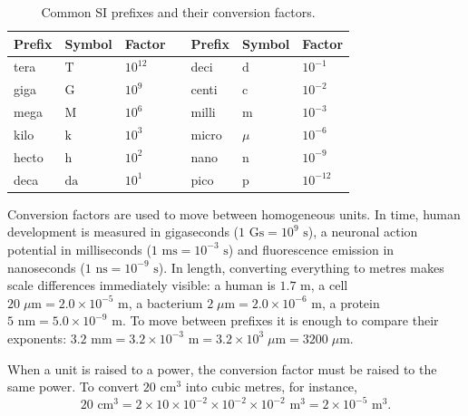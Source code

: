 \documentclass[letterpaper,11pt,leqno]{book}
\begin{document}
\begin{table}[!htbp]
\centering
\caption{Common SI prefixes and their conversion factors.}
\label{tab:si_prefixes}
\begin{tabular*}{\textwidth}{l@{\extracolsep\fill}llclll}
\toprule
Prefix & Symbol & Factor & \hspace{0.8cm} & Prefix & Symbol & Factor \\
\midrule
tera & $\text{T}$ & $10^{12}$ & & deci & $\text{d}$ & $10^{-1}$ \\
giga & $\text{G}$ & $10^9$ & & centi & $\text{c}$ & $10^{-2}$ \\
mega & $\text{M}$ & $10^6$ & & milli & $\text{m}$ & $10^{-3}$ \\
kilo & $\text{k}$ & $10^3$ & & micro & $\mu$ & $10^{-6}$ \\
hecto & $\text{h}$ & $10^2$ & & nano & $\text{n}$ & $10^{-9}$ \\
deca & $\text{da}$ & $10^1$ & & pico & $\text{p}$ & $10^{-12}$ \\
\bottomrule
\end{tabular*}
\end{table}

Conversion factors are used to move between homogeneous units. In time, human development is measured in gigaseconds ($1\text{ Gs} = 10^9\text{ s}$), a neuronal action potential in milliseconds ($1\text{ ms} = 10^{-3}\text{ s}$) and fluorescence emission in nanoseconds ($1\text{ ns} = 10^{-9}\text{ s}$). In length, converting everything to metres makes scale differences immediately visible: a human is $1.7\text{ m}$, a cell $20\;\mu\text{m} = 2.0 \times 10^{-5}\text{ m}$, a bacterium $2\;\mu\text{m} = 2.0 \times 10^{-6}\text{ m}$, a protein $5\text{ nm} = 5.0 \times 10^{-9}\text{ m}$. To move between prefixes it is enough to compare their exponents: $3.2\text{ mm} = 3.2 \times 10^{-3}\text{ m} = 3.2 \times 10^3\;\mu\text{m} = 3200\;\mu\text{m}$.

When a unit is raised to a power, the conversion factor must be raised to the same power. To convert $20\text{ cm}^3$ into cubic metres, for instance,
\begin{equation}
20\text{ cm}^3 = 2 \times 10 \times 10^{-2} \times 10^{-2} \times 10^{-2}\text{ m}^3 = 2 \times 10^{-5}\text{ m}^3.
\label{eq:volume_conversion_calc}
\end{equation}

\end{document}
